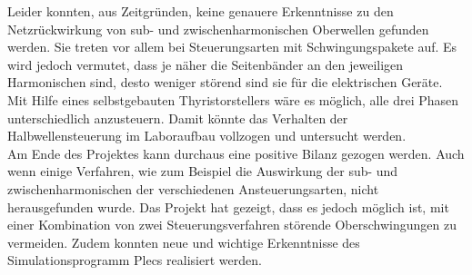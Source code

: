 Leider konnten, aus Zeitgründen, keine genauere Erkenntnisse zu den Netzrückwirkung von sub- und zwischenharmonischen Oberwellen gefunden werden. Sie treten vor allem bei Steuerungsarten mit Schwingungspakete auf. Es wird jedoch vermutet, dass je näher die Seitenbänder an den jeweiligen Harmonischen sind, desto weniger störend sind sie für die elektrischen Geräte.\\
Mit Hilfe eines selbstgebauten Thyristorstellers wäre es möglich, alle drei Phasen unterschiedlich anzusteuern. Damit könnte das Verhalten der Halbwellensteuerung im Laboraufbau vollzogen und untersucht werden.\\
Am Ende des Projektes kann durchaus eine positive Bilanz gezogen werden. Auch wenn einige Verfahren, wie zum Beispiel die Auswirkung der sub- und zwischenharmonischen der verschiedenen Ansteuerungsarten, nicht herausgefunden wurde. Das Projekt hat gezeigt, dass es jedoch möglich ist, mit einer Kombination von zwei Steuerungsverfahren störende Oberschwingungen zu vermeiden. Zudem konnten neue und wichtige Erkenntnisse des Simulationsprogramm Plecs realisiert werden.  





